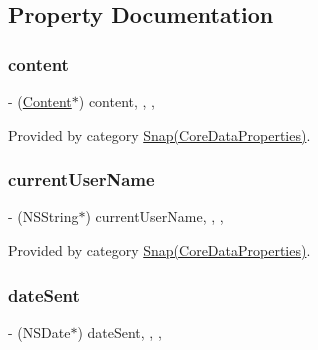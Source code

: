 \subsection{Property Documentation}
\hypertarget{interface_snap_aab265bdb30bcc6e7e7959c873de35446}{}\label{interface_snap_aab265bdb30bcc6e7e7959c873de35446} 
\subsubsection{\texorpdfstring{content}{content}}
{\footnotesize\ttfamily -\/ (\hyperlink{interface_content}{Content}$\ast$) content\hspace{0.3cm}{\ttfamily [read]}, {\ttfamily [write]}, {\ttfamily [nonatomic]}, {\ttfamily [retain]}}



Provided by category \hyperlink{category_snap_07_core_data_properties_08_aab265bdb30bcc6e7e7959c873de35446}{Snap(\+Core\+Data\+Properties)}.

\hypertarget{interface_snap_a8e1375330a30756e65bda38b1621add1}{}\label{interface_snap_a8e1375330a30756e65bda38b1621add1} 
\subsubsection{\texorpdfstring{current\+User\+Name}{currentUserName}}
{\footnotesize\ttfamily -\/ (N\+S\+String$\ast$) current\+User\+Name\hspace{0.3cm}{\ttfamily [read]}, {\ttfamily [write]}, {\ttfamily [nonatomic]}, {\ttfamily [retain]}}



Provided by category \hyperlink{category_snap_07_core_data_properties_08_a8e1375330a30756e65bda38b1621add1}{Snap(\+Core\+Data\+Properties)}.

\hypertarget{interface_snap_a6691bfaebad4a5f85af2f2c81e182f73}{}\label{interface_snap_a6691bfaebad4a5f85af2f2c81e182f73} 
\subsubsection{\texorpdfstring{date\+Sent}{dateSent}}
{\footnotesize\ttfamily -\/ (N\+S\+Date$\ast$) date\+Sent\hspace{0.3cm}{\ttfamily [read]}, {\ttfamily [write]}, {\ttfamily [nonatomic]}, {\ttfamily [retain]}}



